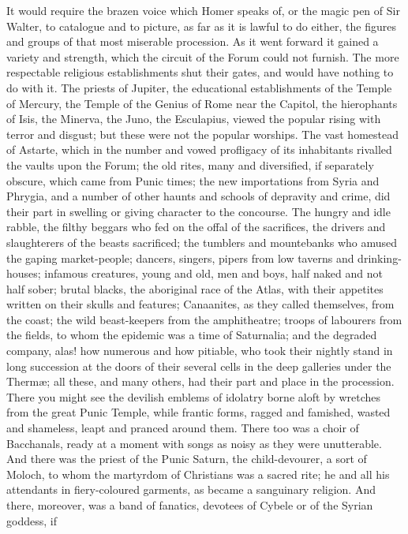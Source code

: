It would require the brazen voice which Homer speaks of, or the
magic pen of Sir Walter, to catalogue and to picture, as far as it is
lawful to do either, the figures and groups of that most miserable
procession. As it went forward it gained a variety and strength, which
the circuit of the Forum could not furnish. The more respectable
religious establishments shut their gates, and would have nothing to
do with it. The priests of Jupiter, the educational establishments of
the Temple of Mercury, the Temple of the Genius of Rome near the
Capitol, the hierophants of Isis, the Minerva, the Juno, the
Esculapius, viewed the popular rising with terror and disgust;
but these were not the popular worships. The vast homestead of Astarte,
which in the number and vowed profligacy of its inhabitants rivalled
the vaults upon the Forum; the old rites, many and diversified, if
separately obscure, which came from Punic times; the new importations
from Syria and Phrygia, and a number of other haunts and schools of
depravity and crime, did their part in swelling or giving character to
the concourse. The hungry and idle rabble, the filthy beggars who fed
on the offal of the sacrifices, the drivers and slaughterers of the
beasts sacrificed; the tumblers and mountebanks who amused the gaping
market-people; dancers, singers, pipers from low taverns and
drinking-houses; infamous creatures, young and old, men and boys, half
naked and not half sober; brutal blacks, the aboriginal race of the
Atlas, with their appetites written on their skulls and features;
Canaanites, as they called themselves, from the coast; the wild
beast-keepers from the amphitheatre; troops of labourers from the
fields, to whom the epidemic was a time of Saturnalia; and the
degraded company, alas! how numerous and how pitiable, who took their
nightly stand in long succession at the doors of their several cells
in the deep galleries under the Thermæ; all these, and many others,
had their part and place in the procession. There you might see the
devilish emblems of idolatry borne aloft by wretches from the great
Punic Temple, while frantic forms, ragged and famished, wasted and
shameless, leapt and pranced around them. There too was a choir
of Bacchanals, ready at a moment with songs as noisy as they were
unutterable. And there was the priest of the Punic Saturn, the
child-devourer, a sort of Moloch, to whom the martyrdom of Christians
was a sacred rite; he and all his attendants in fiery-coloured
garments, as became a sanguinary religion. And there, moreover, was a
band of fanatics, devotees of Cybele or of the Syrian goddess, if
